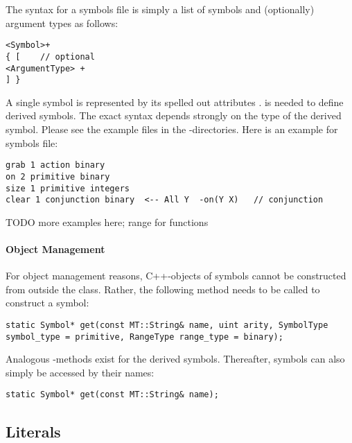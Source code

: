 \documentclass[10pt,twoside,twocolumn,fleqn]{article}
\begin{document}
The syntax for a symbols file is simply a list of symbols and
(optionally) argument types as follows:
\begin{lstlisting}
<Symbol>+
{ [    // optional
<ArgumentType> +
] }
\end{lstlisting}
A single symbol is represented by its spelled out attributes . \code{[otherstuff]} is needed to
define derived symbols. The exact syntax depends strongly on the type of
the derived symbol. Please see the example files in the
-directories. Here is an example for symbols file:
\begin{lstlisting}
grab 1 action binary
on 2 primitive binary
size 1 primitive integers
clear 1 conjunction binary  <-- All Y  -on(Y X)   // conjunction
\end{lstlisting}
TODO more examples here; range for functions




\paragraph{Object Management}

For object management reasons, C++-objects of symbols cannot be constructed
from outside the class. Rather, the following method needs to be called to
construct a symbol:    
\begin{lstlisting}
static Symbol* get(const MT::String& name, uint arity, SymbolType
symbol_type = primitive, RangeType range_type = binary);
\end{lstlisting}
Analogous -methods exist for the derived symbols. Thereafter,
symbols can also simply be accessed by their names:
\begin{lstlisting}
static Symbol* get(const MT::String& name);
\end{lstlisting}





    








\subsection{Literals}
\end{document}
